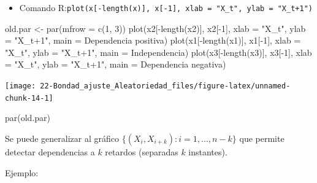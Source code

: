 \documentclass[
]{book}
\newenvironment{Shaded}{\begin{snugshade}}{\end{snugshade}}
\newcommand{\AttributeTok}[1]{\textcolor[rgb]{0.77,0.63,0.00}{#1}}
\newcommand{\DecValTok}[1]{\textcolor[rgb]{0.00,0.00,0.81}{#1}}
\newcommand{\FunctionTok}[1]{\textcolor[rgb]{0.00,0.00,0.00}{#1}}
\newcommand{\NormalTok}[1]{#1}
\newcommand{\OtherTok}[1]{\textcolor[rgb]{0.56,0.35,0.01}{#1}}
\newcommand{\SpecialCharTok}[1]{\textcolor[rgb]{0.00,0.00,0.00}{#1}}
\newcommand{\StringTok}[1]{\textcolor[rgb]{0.31,0.60,0.02}{#1}}
\providecommand{\tightlist}{%
  \setlength{\itemsep}{0pt}\setlength{\parskip}{0pt}}
\theoremstyle{break}
\theoremstyle{nonumberplain}
\begin{document}
\begin{itemize}
\tightlist
\item
  Comando R:\texttt{plot(x{[}-length(x){]},\ x{[}-1{]},\ xlab\ =\ "X\_t",\ ylab\ =\ "X\_t+1")}
\end{itemize}

\begin{Shaded}
\begin{Highlighting}[]
\NormalTok{old.par }\OtherTok{\textless{}{-}} \FunctionTok{par}\NormalTok{(}\AttributeTok{mfrow =} \FunctionTok{c}\NormalTok{(}\DecValTok{1}\NormalTok{, }\DecValTok{3}\NormalTok{))}
\FunctionTok{plot}\NormalTok{(x2[}\SpecialCharTok{{-}}\FunctionTok{length}\NormalTok{(x2)], x2[}\SpecialCharTok{{-}}\DecValTok{1}\NormalTok{], }\AttributeTok{xlab =} \StringTok{"X\_t"}\NormalTok{, }\AttributeTok{ylab =} \StringTok{"X\_t+1"}\NormalTok{, }\AttributeTok{main =} \StringTok{\textquotesingle{}Dependencia positiva\textquotesingle{}}\NormalTok{)}
\FunctionTok{plot}\NormalTok{(x1[}\SpecialCharTok{{-}}\FunctionTok{length}\NormalTok{(x1)], x1[}\SpecialCharTok{{-}}\DecValTok{1}\NormalTok{], }\AttributeTok{xlab =} \StringTok{"X\_t"}\NormalTok{, }\AttributeTok{ylab =} \StringTok{"X\_t+1"}\NormalTok{, }\AttributeTok{main =} \StringTok{\textquotesingle{}Independencia\textquotesingle{}}\NormalTok{)}
\FunctionTok{plot}\NormalTok{(x3[}\SpecialCharTok{{-}}\FunctionTok{length}\NormalTok{(x3)], x3[}\SpecialCharTok{{-}}\DecValTok{1}\NormalTok{], }\AttributeTok{xlab =} \StringTok{"X\_t"}\NormalTok{, }\AttributeTok{ylab =} \StringTok{"X\_t+1"}\NormalTok{, }\AttributeTok{main =} \StringTok{\textquotesingle{}Dependencia negativa\textquotesingle{}}\NormalTok{)}
\end{Highlighting}
\end{Shaded}

\begin{center}\texttt{[image: 22-Bondad\_ajuste\_Aleatoriedad\_files/figure-latex/unnamed-chunk-14-1]} \end{center}

\begin{Shaded}
\begin{Highlighting}[]
\FunctionTok{par}\NormalTok{(old.par)}
\end{Highlighting}
\end{Shaded}

Se puede generalizar al gráfico \(\{(X_{i},X_{i+k}) : i = 1, \ldots, n-k \}\)
que permite detectar dependencias a \(k\) retardos
(separadas \(k\) instantes).

Ejemplo:
\end{document}
